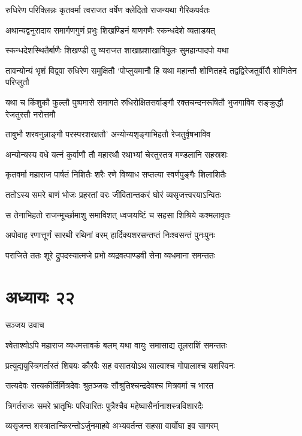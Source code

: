 \twolineshloka
{रुधिरेण परिक्लिन्नः कृतवर्मा त्वराजत}
{वर्षेण क्लेदितो राजन्यथा गैरिकपर्वतः}


\twolineshloka
{अथान्यद्वनुरादाय समार्गणगुणं प्रभुः}
{शिखण्डिनं बाणगणैः स्कन्धदेशे व्यताडयत्}


\twolineshloka
{स्कन्धदेशस्थितैर्बाणैः शिखण्डी तु व्यराजत}
{शाखाप्रशाखाविपुलः सुमहान्पादपो यथा}


\threelineshloka
{तावन्योन्यं भृशं विद्व्वा रुधिरेण समुक्षितौ}
{`पोप्लुयमानौ हि यथा महान्तौ शोणितहदे}
{तद्वद्विरेजतुर्वीरौ शोणितेन परिप्लुतौ}


\threelineshloka
{यथा च किंशुकौ फुल्लौ पुष्पमासे समागते}
{रुधिरोक्षितसर्वाङ्गौ रक्तचन्दनरूषितौ}
{भुजगाविव सङ्क्रुद्धौ रेजतुस्तौ नरोत्तमौ}


\twolineshloka
{तावुभौ शरवनुन्नाङ्गौ परस्परशरक्षतौ'}
{अन्योन्यशृङ्गाभिहतौ रेजतुर्वृषभाविव}


\twolineshloka
{अन्योन्यस्य वधे यत्नं कुर्वाणौ तौ महारथौ}
{रथाभ्यां चेरतुस्तत्र मण्डलानि सहस्रशः}


\twolineshloka
{कृतवर्मा महाराज पार्षतं निशितैः शरैः}
{रणे विव्याध सप्तत्या स्वर्णपुङ्गैः शिलाशितैः}


\twolineshloka
{ततोऽस्य समरे बाणं भोजः प्रहरतां वरः}
{जीवितान्तकरं घोरं व्यसृजत्त्वरयाऽन्वितः}


\twolineshloka
{स तेनाभिहतो राजन्मूर्च्छामाशु समाविशत्}
{ध्वजयष्टिं च सहसा शिश्रिये कश्मलावृतः}


\twolineshloka
{अपोवाह रणात्तूर्णं सारथी रथिनां वरम्}
{हार्दिक्यशरसन्तप्तं निःश्वसन्तं पुनःपुनः}


\twolineshloka
{पराजिते ततः शूरे द्रुपदस्यात्मजे प्रभो}
{व्यद्रवत्पाण्डवी सेना व्यधमाना समन्ततः}


\chapter{अध्यायः २२}
\twolineshloka
{सञ्जय उवाच}
{}


\twolineshloka
{श्वेताश्वोऽपि महाराज व्यधमत्तावकं बलम्}
{यथा वायुः समासाद्य तूलराशिं समन्ततः}


\twolineshloka
{प्रत्युद्ययुस्त्रिगर्तास्तं शिबयः कौरवैः सह}
{वसातयोऽथ साल्वाश्च गोपालाश्च यशस्विनः}


\twolineshloka
{सत्यदेवः सत्यकीर्तिर्मित्रदेवः श्रुतञ्जयः}
{सौश्रुतिश्चन्द्रदेवश्च मित्रवर्मा च भारत}


\twolineshloka
{त्रिगर्तराजः समरे भ्रातृभिः परिवारितः}
{पुत्रैश्चैव महेष्वासैर्नानाशस्त्रविशारदैः}


\twolineshloka
{व्यसृजन्त शस्त्रातान्किरन्तोऽर्जुनमाहवे}
{अभ्यवर्तन्त सहसा वार्योघा इव सागरम्}


